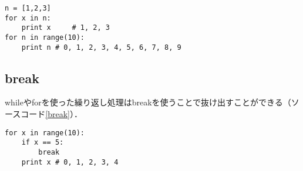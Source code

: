 \begin{lstlisting}[caption=forの使い方, label=for]
n = [1,2,3]
for x in n:
	print x 	# 1, 2, 3
for n in range(10):
	print n	# 0, 1, 2, 3, 4, 5, 6, 7, 8, 9
\end{lstlisting}


\subsection{break}
whileやforを使った繰り返し処理はbreakを使うことで抜け出すことができる（ソースコード\ref{break}）．
\begin{lstlisting}[caption=break, label=break]
 for x in range(10):
 	if x == 5:
		break
	print x	# 0, 1, 2, 3, 4
\end{lstlisting}

